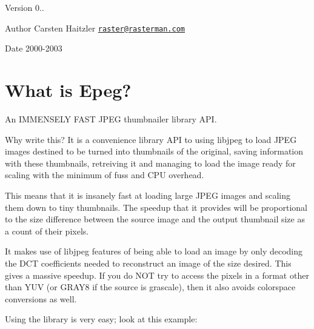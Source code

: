  \begin{DoxyVersion}{Version}
0.. 
\end{DoxyVersion}
\begin{DoxyAuthor}{Author}
Carsten Haitzler \href{mailto:raster@rasterman.com}{\tt raster@rasterman.\+com} 
\end{DoxyAuthor}
\begin{DoxyDate}{Date}
2000-\/2003
\end{DoxyDate}
\hypertarget{index_intro}{}\section{What is Epeg?}\label{index_intro}
An I\+M\+M\+E\+N\+S\+E\+L\+Y F\+A\+S\+T J\+P\+E\+G thumbnailer library A\+P\+I.

Why write this? It is a convenience library A\+P\+I to using libjpeg to load J\+P\+E\+G images destined to be turned into thumbnails of the original, saving information with these thumbnails, retreiving it and managing to load the image ready for scaling with the minimum of fuss and C\+P\+U overhead.

This means that it is insanely fast at loading large J\+P\+E\+G images and scaling them down to tiny thumbnails. The speedup that it provides will be proportional to the size difference between the source image and the output thumbnail size as a count of their pixels.

It makes use of libjpeg features of being able to load an image by only decoding the D\+C\+T coefficients needed to reconstruct an image of the size desired. This gives a massive speedup. If you do N\+O\+T try to access the pixels in a format other than Y\+U\+V (or G\+R\+A\+Y8 if the source is grascale), then it also avoids colorspace conversions as well.

Using the library is very easy; look at this example\+:


